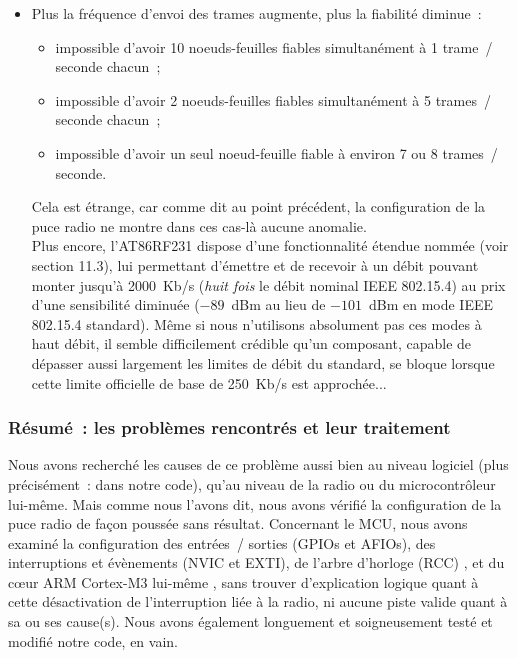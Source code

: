 \begin{itemize}
\begin{itemize}
  \item Plus la fréquence d'envoi des trames augmente, plus la fiabilité
  diminue~:
    \begin{itemize}
    \item impossible d'avoir 10 noeuds-feuilles fiables simultanément
          à 1 trame~/ seconde chacun~;
    \item impossible d'avoir 2 noeuds-feuilles fiables simultanément
          à 5 trames~/ seconde chacun~;
    \item impossible d'avoir un seul noeud-feuille fiable
          à environ 7 ou 8 trames~/ seconde.
  \end{itemize}
  Cela est étrange, car comme dit au point précédent, la configuration de la
  puce radio ne montre dans ces cas-là aucune anomalie.\\
  Plus encore, l'AT86RF231 dispose d'une fonctionnalité étendue nommée
   (voir \cite{DSAT86RF231} section 11.3),
  lui permettant d'émettre et de recevoir à un débit pouvant monter jusqu'à
  2000~Kb/s (\emph{huit fois} le débit nominal IEEE 802.15.4) au prix d'une
  sensibilité diminuée ($-89$~dBm au lieu de $-101$~dBm en mode IEEE 802.15.4
  standard). Même si nous n'utilisons absolument pas ces modes à haut débit,
  il semble difficilement crédible qu'un composant, capable de dépasser aussi
  largement les limites de débit du standard, se bloque lorsque cette
  limite officielle de base de 250~Kb/s est approchée...

  \end{itemize}

\end{itemize}

\subsubsection{Résumé~: les problèmes rencontrés et leur traitement}
\label{ResumePbTech}

Nous avons recherché les causes de ce problème aussi bien au niveau
logiciel (plus précisément~: dans notre code), qu'au niveau de la radio ou
du microcontrôleur lui-même. Mais comme nous l'avons dit, nous avons vérifié
la configuration de la puce radio de façon poussée sans résultat.
Concernant le MCU, nous avons examiné la configuration des entrées~/ sorties
(GPIOs et AFIOs), des interruptions et évènements (NVIC et EXTI), de l'arbre
d'horloge (RCC) \cite{ManSTM32F10x}, et du c{\oe}ur ARM Cortex-M3 lui-même
\cite{ManSTMCortexM3}, sans trouver d'explication logique quant à cette
désactivation de l'interruption liée à la radio, ni aucune piste valide
quant à sa ou ses cause(s). Nous avons également longuement et
soigneusement testé et modifié notre code, en vain.

